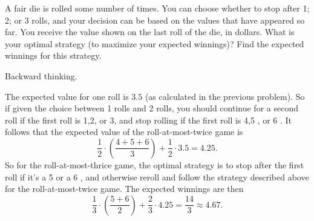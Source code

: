 
\setcounter{theorem}{3}
\begin{exercise} [BH.4.4]
    A fair die is rolled some number of times. You can choose whether to stop after 1; 2; or
    3 rolls, and your decision can be based on the values that have appeared so far. You
    receive the value shown on the last roll of the die, in dollars. What is your optimal
    strategy (to maximize your expected winnings)? Find the expected winnings for this
    strategy. 
\begin{hint}
    Backward thinking. 
\end{hint}
\begin{solution}
    The expected value for one roll is $3.5$ (as calculated in the previous problem). So if given the choice between 1 rolls and 2 rolls, you should continue for a second roll if the first roll is 1,2, or 3, and stop rolling if the first roll is 4,5 , or 6 . It follows that the expected value of the roll-at-most-twice game is
    $$
    \frac{1}{2} \cdot\left(\frac{4+5+6}{3}\right)+\frac{1}{2} \cdot 3.5=4.25 .
    $$
    So for the roll-at-most-thrice game, the optimal strategy is to stop after the first roll if it's a 5 or a 6 , and otherwise reroll and follow the strategy described above for the roll-at-most-twice game.
    The expected winnings are then
    $$
    \frac{1}{3} \cdot\left(\frac{5+6}{2}\right)+\frac{2}{3} \cdot 4.25=\frac{14}{3} \approx 4.67 .
    $$
\end{solution}
\end{exercise}

